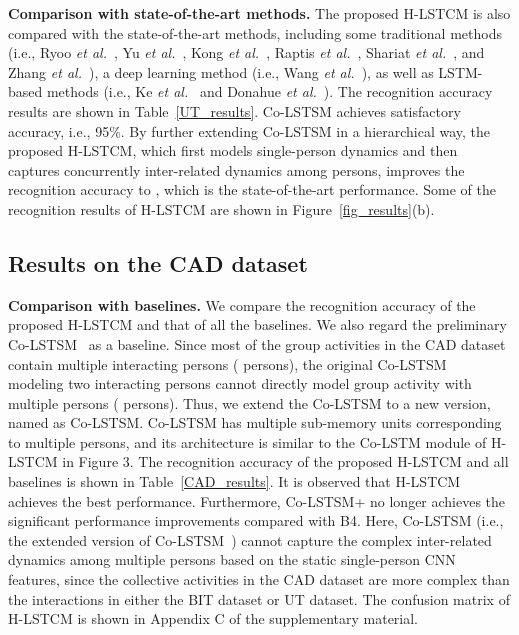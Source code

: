 \documentclass[9pt,journal,letterpaper,twocolumn]{IEEEtran}
\begin{document}
	
	{\bf Comparison with state-of-the-art methods.} The proposed H-LSTCM is also compared
	with the state-of-the-art methods, including some traditional methods (i.e., Ryoo {\em et al.}~\cite{ryoo2009spatio}, Yu {\em et al.}~\cite{yu2010real}, Kong {\em et al.}~\cite{kong2012leraning,kong2014interactive,kong2016close},
	Raptis {\em et al.}~\cite{raptis2013poselet}, Shariat {\em et al.}~\cite{shariat2013a}, and Zhang {\em et al.}~\cite{zhang2012spatio}), a deep learning method (i.e., Wang {\em et al.}~\cite{wang2015hierarchical}), as well as LSTM-based methods (i.e., Ke {\em et al.}~\cite{ke2016spatial} and Donahue {\em et al.}~\cite{donahue2015long}).
	The recognition accuracy results are shown in Table~\ref{UT_results}. Co-LSTSM achieves satisfactory accuracy, i.e., 95\%. By further extending Co-LSTSM in a hierarchical way, the proposed H-LSTCM, which first models single-person dynamics and then captures concurrently inter-related dynamics among persons, improves the recognition accuracy to , which is the state-of-the-art performance. Some of the recognition results of H-LSTCM are shown in Figure~\ref{fig_results}(b).
	

	
	
	
	
	\subsection{Results on the CAD dataset}	
	\label{cad}	
	{\bf Comparison with baselines.} We compare the recognition accuracy of the proposed H-LSTCM and that of all the baselines. We also regard the preliminary Co-LSTSM~\cite{shu2017concurrence} as a baseline. Since most of the group activities in the CAD dataset contain multiple interacting persons ( persons), the original Co-LSTSM~\cite{shu2017concurrence} modeling two interacting persons cannot directly model group activity with multiple persons ( persons). Thus, we extend the Co-LSTSM to a new version, named as Co-LSTSM. Co-LSTSM has multiple sub-memory units corresponding to multiple persons, and its architecture is similar to the Co-LSTM module of H-LSTCM in Figure 3. The recognition accuracy of the proposed H-LSTCM and all baselines is shown in Table~\ref{CAD_results}. It is observed that H-LSTCM achieves the best performance. Furthermore, Co-LSTSM+ no longer achieves the significant performance improvements compared with B4. Here, Co-LSTSM (i.e., the extended version of Co-LSTSM~\cite{shu2017concurrence}) cannot capture the complex inter-related dynamics among multiple persons based on the static single-person CNN features, since the collective activities in the CAD dataset are more complex than the interactions in either the BIT dataset or UT dataset. The confusion matrix of H-LSTCM is shown in Appendix C of the supplementary material.    
\end{document}
